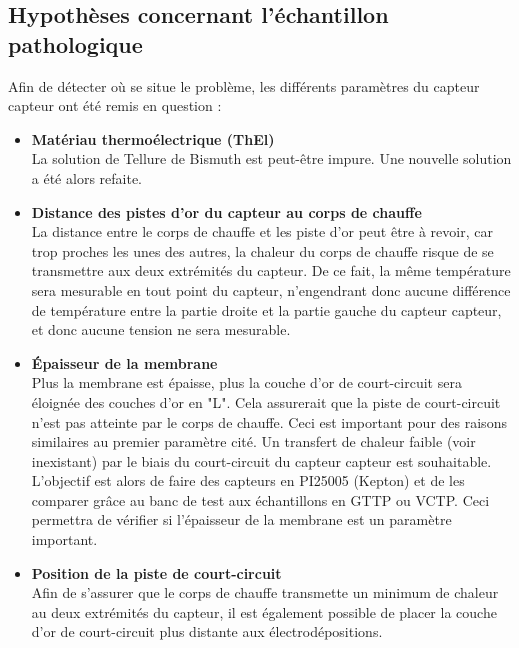 \subsection{Hypothèses concernant l'échantillon pathologique}
Afin de détecter où se situe le problème, les différents paramètres du capteur \gls{capteur} ont été remis en question :
\begin{itemize}
    \item \textbf{Matériau thermoélectrique (ThEl)}\\
          La solution de Tellure de Bismuth est peut-être impure. Une nouvelle solution a été alors refaite.
          
    \item \textbf{Distance des pistes d'or du capteur au corps de chauffe}\\
          La distance entre le corps de chauffe et les piste d'or peut être à revoir, car trop proches les unes des autres, la chaleur du corps
          de chauffe risque de se transmettre aux deux extrémités du capteur. De ce fait, la même température sera mesurable en tout point du
          capteur, n'engendrant donc aucune différence de température entre la partie droite et la partie gauche du capteur \gls{capteur}, et donc aucune
          tension ne sera mesurable.\\
          
    \item \textbf{Épaisseur de la membrane} \\
          Plus la membrane est épaisse, plus la couche d'or de court-circuit sera éloignée des couches d'or en "L". Cela assurerait que la piste 
          de court-circuit n'est pas atteinte par le corps de chauffe. Ceci est important pour des raisons similaires au premier paramètre cité. 
          Un transfert de chaleur faible (voir inexistant) par le biais du court-circuit du capteur \gls{capteur} est souhaitable. \\
          
          L'objectif est alors de faire des capteurs en PI25005 (Kepton) et de les comparer grâce au banc de test aux échantillons en GTTP ou VCTP.
          Ceci permettra de vérifier si l'épaisseur de la membrane est un paramètre important.\\
          
    \item \textbf{Position de la piste de court-circuit}\\
          Afin de s'assurer que le corps de chauffe transmette un minimum de chaleur au deux extrémités du capteur, il est également possible de 
          placer la couche d'or de court-circuit plus distante aux électrodépositions.\\
          

\end{itemize}
